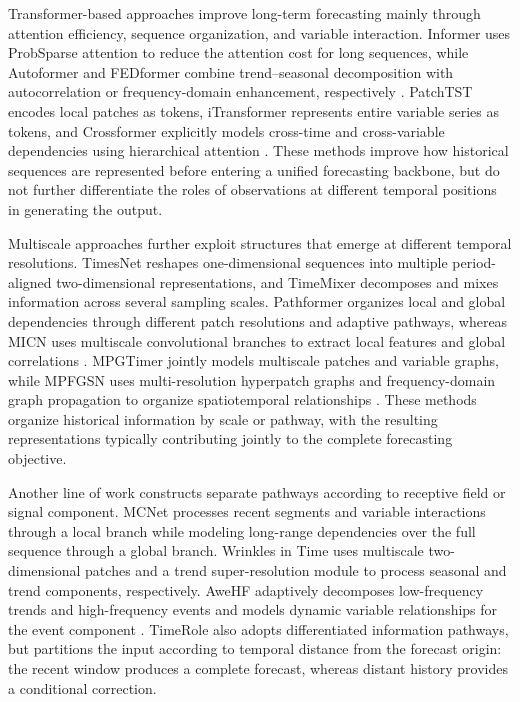 Transformer-based approaches improve long-term forecasting mainly through attention efficiency, sequence organization, and variable interaction. Informer uses ProbSparse attention to reduce the attention cost for long sequences, while Autoformer and FEDformer combine trend--seasonal decomposition with autocorrelation or frequency-domain enhancement, respectively \citep{Zhou2021Informer,Wu2021Autoformer,Zhou2022FEDformer}. PatchTST encodes local patches as tokens, iTransformer represents entire variable series as tokens, and Crossformer explicitly models cross-time and cross-variable dependencies using hierarchical attention \citep{Nie2023PatchTST,Liu2024iTransformer,Zhang2023Crossformer}. These methods improve how historical sequences are represented before entering a unified forecasting backbone, but do not further differentiate the roles of observations at different temporal positions in generating the output.

Multiscale approaches further exploit structures that emerge at different temporal resolutions. TimesNet reshapes one-dimensional sequences into multiple period-aligned two-dimensional representations, and TimeMixer decomposes and mixes information across several sampling scales. Pathformer organizes local and global dependencies through different patch resolutions and adaptive pathways, whereas MICN uses multiscale convolutional branches to extract local features and global correlations \citep{Wu2023TimesNet,Wang2024TimeMixer,Chen2024Pathformer,Wang2023MICN}. MPGTimer jointly models multiscale patches and variable graphs, while MPFGSN uses multi-resolution hyperpatch graphs and frequency-domain graph propagation to organize spatiotemporal relationships \citep{Duan2026MPGTimer,Zheng2025MPFGSN}. These methods organize historical information by scale or pathway, with the resulting representations typically contributing jointly to the complete forecasting objective.

Another line of work constructs separate pathways according to receptive field or signal component. MCNet processes recent segments and variable interactions through a local branch while modeling long-range dependencies over the full sequence through a global branch. Wrinkles in Time uses multiscale two-dimensional patches and a trend super-resolution module to process seasonal and trend components, respectively. AweHF adaptively decomposes low-frequency trends and high-frequency events and models dynamic variable relationships for the event component \citep{Sun2024MCNet,Chen2026Wrinkles,Gong2026AweHF}. TimeRole also adopts differentiated information pathways, but partitions the input according to temporal distance from the forecast origin: the recent window produces a complete forecast, whereas distant history provides a conditional correction.

